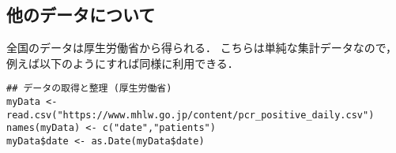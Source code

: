 \documentclass[10pt,oneside,fleqn]{scrartcl}
\begin{document}
\subsection{他のデータについて}
\label{sec:org8bc06ed}

全国のデータは厚生労働省から得られる．
こちらは単純な集計データなので，
例えば以下のようにすれば同様に利用できる．

\begin{verbatim}
## データの取得と整理 (厚生労働省)
myData <- read.csv("https://www.mhlw.go.jp/content/pcr_positive_daily.csv")
names(myData) <- c("date","patients")
myData$date <- as.Date(myData$date)
\end{verbatim}
\end{document}
